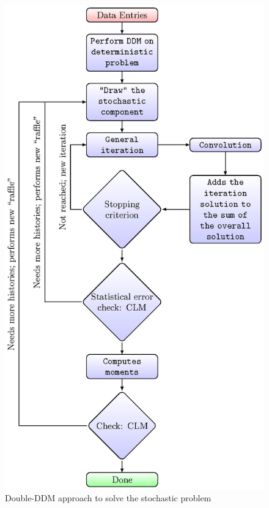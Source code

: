\documentclass[preprint,12pt,authoryear]{elsarticle}
\begin{document}
\begin{figure}[H]
\centering
 \includegraphics[scale=1]{fig2.eps} 
\caption{\footnotesize{Double-DDM approach to solve the stochastic problem}}\label{fig2}
\end{figure}
\end{document}
